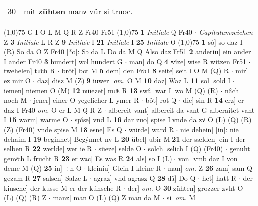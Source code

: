 \documentclass[8pt,a4paper,notitlepage]{article}
\begin{document}
\begin{table}[ht]
\begin{minipage}[t]{0.5\linewidth}
\begin{tabular}{rl}
30 & mit \textbf{zühten} man\textbf{z} vür si truoc.\\ 
\end{tabular}
\scriptsize
\line(1,0){75} \newline
G I O L M Q R Z Fr40 Fr51 \newline
\line(1,0){75} \newline
\textbf{1} \textit{Initiale} Q Fr40   $\cdot$ \textit{Capitulumzeichen} Z  \textbf{3} \textit{Initiale} L R Z  \textbf{9} \textit{Initiale} I  \textbf{21} \textit{Initiale} I  \textbf{25} \textit{Initiale} O  \newline
\line(1,0){75} \newline
\textbf{1} sô] so daz I (R) So da O Z Fr40 [*o]: So da L Do da M Q Also daz Fr51 \textbf{2} anderiu] ein ander I ander Fr40 \textbf{3} hundert] wol hundert G  $\cdot$ man] do Q \textbf{4} wîze] wise R witzen Fr51  $\cdot$ twehelen] tuͦch R  $\cdot$ brôt] bot M \textbf{5} dem] den Fr51 \textbf{8} seite] seit I O M (Q) R  $\cdot$ mir] ez mir O  $\cdot$ daz] disz M (Z) \textbf{9} iuwer] \textit{om.} O M \textbf{10} daz] Waz L \textbf{11} sol] sold I  $\cdot$ iemen] niemen O (M) \textbf{12} müezet] muͦs R \textbf{13} swâ] war L wo M (Q) (R)  $\cdot$ nâch] noch M  $\cdot$ jener] einer O yegelicher L ymer R  $\cdot$ bôt] rot Q  $\cdot$ die] sin R \textbf{14} erz] er daz I Fr40 \textit{om.} O er L M Q R Z  $\cdot$ albereit vant] albereit da vant G alberaitet vant I \textbf{15} warm] warme O  $\cdot$ spîse] vnd L \textbf{16} dar zuo] spise I vnde da zvͦ O (L) (Q) (R) (Z) (Fr40) vnde spise M \textbf{18} esne] Es Q  $\cdot$ würde] ward R  $\cdot$ nie dehein] [in]: nie dehaim I \textbf{19} beginnet] Begýnnet nv L \textbf{20} übel] ubir M \textbf{21} der sælden] ein I der selben R \textbf{22} werlde] wer ie R  $\cdot$ süeze] selde O  $\cdot$ solch] selich I (Q) (Fr40)  $\cdot$ genuht] genvͯch L frucht R \textbf{23} er wac] Es was R \textbf{24} als] so I (L)  $\cdot$ von] vmb daz I von deme M (Q) \textbf{25} in] ÷n O  $\cdot$ kleiniu] Glein I kleine R  $\cdot$ man] \textit{om.} Z \textbf{26} zam] sam Q gezam R \textbf{27} salsen] Salze L  $\cdot$ agraz] vnd agrasz Q \textbf{28} dâ] Do Q  $\cdot$ het] hatt R  $\cdot$ der kiusche] der kusse M er der kúnsche R  $\cdot$ der] \textit{om.} O \textbf{30} zühten] grozzer zvht O (L) (Q) (R) Z  $\cdot$ manz] man O (L) (Q) Z man da M  $\cdot$ si] \textit{om.} M \newline
\end{minipage}
\hspace{0.5cm}
\begin{minipage}[t]{0.5\linewidth}

\end{minipage}
\end{table}
\end{document}
